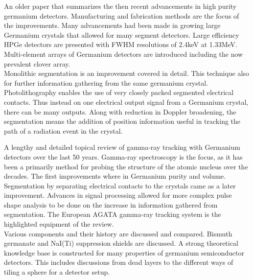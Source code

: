 \documentclass[12pt]{article}
\begin{document}
\begin{doublespacing}
An older paper that summarizes the then recent advancements in high purity germanium detectors. Manufacturing and fabrication methods are the focus of the improvements. Many advancements had been made in growing large Germanium crystals that allowed for many segment detectors. Large efficiency HPGe detectors are presented with FWHM resolutions of 2.4keV at 1.33MeV. Multi-element arrays of Germanium detectors are introduced including the now prevalent clover array.
\\
Monolithic segmentation is an improvement covered in detail. This technique also for further information gathering from the same germanium crystal. Photolithography enables the use of very closely packed segmented electrical contacts. Thus instead on one electrical output signal from a Germanium crystal, there can be many outputs. Along with reduction in Doppler broadening, the segmentation means the addition of position information useful in tracking the path of a radiation event in the crystal.
\\[20pt]


{\large\textbf{\cite{Eberth2008283}}}

A lengthy and detailed topical review of gamma-ray tracking with Germanium detectors over the last 50 years. Gamma-ray spectroscopy is the focus, as it has been a primarily method for probing the structure of the atomic nucleus over the decades. The first improvements where in Germanium purity and volume. Segmentation by separating electrical contacts to the crystals came as a later improvement. Advances in signal processing allowed for more complex pulse shape analysis to be done on the increase in information gathered from segmentation. The European AGATA gamma-ray tracking system is the highlighted equipment of the review.
\\
Various components and their history are discussed and compared. Bismuth germanate and NaI(Ti) suppression shields are discussed. A strong theoretical knowledge base is constructed for many properties of germanium semiconductor detectors. This includes discussions from dead layers to the different ways of tiling a sphere for a detector setup.
\\[20pt]


{\large\textbf{\cite{Descovich2005535}}}


\end{doublespacing}
\end{document}
